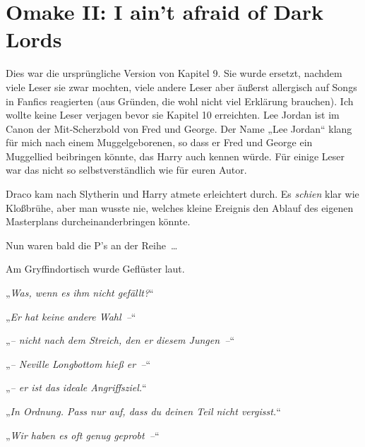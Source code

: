 


\section{Omake II: I ain't afraid of Dark Lords}

Dies war die ursprüngliche Version von Kapitel 9. Sie wurde ersetzt, nachdem viele Leser sie zwar mochten, viele andere Leser aber äußerst allergisch auf Songs in Fanfics reagierten (aus Gründen, die wohl nicht viel Erklärung brauchen). Ich wollte keine Leser verjagen bevor sie Kapitel 10 erreichten.
Lee Jordan ist im Canon der Mit-Scherzbold von Fred und George. Der Name „Lee Jordan“ klang für mich nach einem Muggelgeborenen, so dass er Fred und George ein Muggellied beibringen könnte, das Harry auch kennen würde. Für einige Leser war das nicht so selbstverständlich wie für euren Autor.

\later

Draco kam nach Slytherin und Harry atmete erleichtert durch. Es \emph{schien} klar wie Kloßbrühe, aber man wusste nie, welches kleine Ereignis den Ablauf des eigenen Masterplans durcheinanderbringen könnte.

Nun waren bald die P’s an der Reihe …

Am Gryffindortisch wurde Geflüster laut.

„\emph{Was, wenn es ihm nicht gefällt?}“

„\emph{Er hat keine andere Wahl –}“

„\emph{– nicht nach dem Streich, den er diesem Jungen –}“

„\emph{– Neville Longbottom hieß er –}“

„\emph{– er ist das ideale Angriffsziel.}“

„\emph{In Ordnung. Pass nur auf, dass du deinen Teil nicht vergisst.}“

„\emph{Wir haben es oft genug geprobt –}“

